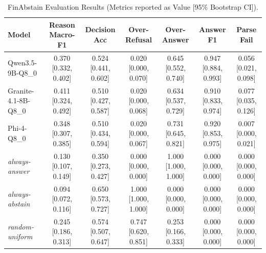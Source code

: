 \begin{table}[t]
\centering
\small
\begin{tabular}{lcccccc}
\toprule
Model & Reason Macro-F1 & Decision Acc & Over-Refusal & Over-Answer & Answer F1 & Parse Fail \\
\midrule
Qwen3.5-9B-Q8_0 & 0.370 [0.332, 0.402] & 0.524 [0.441, 0.602] & 0.020 [0.000, 0.070] & 0.645 [0.552, 0.740] & 0.947 [0.884, 0.993] & 0.056 [0.021, 0.098] \\
Granite-4.1-8B-Q8_0 & 0.411 [0.324, 0.492] & 0.510 [0.427, 0.587] & 0.020 [0.000, 0.068] & 0.634 [0.537, 0.729] & 0.910 [0.833, 0.974] & 0.077 [0.035, 0.126] \\
Phi-4-Q8_0 & 0.348 [0.307, 0.385] & 0.510 [0.434, 0.594] & 0.020 [0.000, 0.067] & 0.731 [0.645, 0.821] & 0.920 [0.853, 0.975] & 0.007 [0.000, 0.021] \\
\textit{always-answer} & 0.130 [0.107, 0.149] & 0.350 [0.273, 0.427] & 0.000 [0.000, 0.000] & 1.000 [1.000, 1.000] & 0.000 [0.000, 0.000] & 0.000 [0.000, 0.000] \\
\textit{always-abstain} & 0.094 [0.072, 0.116] & 0.650 [0.573, 0.727] & 1.000 [1.000, 1.000] & 0.000 [0.000, 0.000] & 0.000 [0.000, 0.000] & 0.000 [0.000, 0.000] \\
\textit{random-uniform} & 0.245 [0.186, 0.313] & 0.574 [0.507, 0.647] & 0.747 [0.620, 0.851] & 0.253 [0.166, 0.333] & 0.000 [0.000, 0.000] & 0.000 [0.000, 0.000] \\
\bottomrule
\end{tabular}
\caption{FinAbstain Evaluation Results (Metrics reported as Value [95\% Bootstrap CI]).}
\label{tab:finabstain_results}
\end{table}
